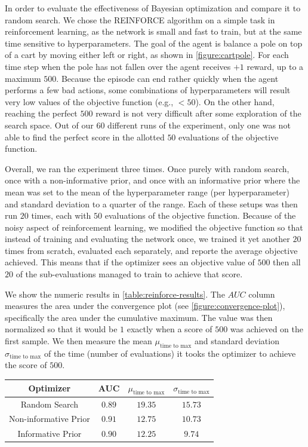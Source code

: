 In order to evaluate the effectiveness of Bayesian optimization and compare it to random search. We chose the REINFORCE algorithm on a simple task in reinforcement learning, as the network is small and fast to train, but at the same time sensitive to hyperparameters. The goal of the agent is balance a pole on top of a cart by moving either left or right, as shown in \autoref{figure:cartpole}. For each time step when the pole has not fallen over the agent receives $+1$ reward, up to a maximum $500$. Because the episode can end rather quickly when the agent performs a few bad actions, some combinations of hyperparameters will result very low values of the objective function (e.g., $< 50$). On the other hand, reaching the perfect $500$ reward is not very difficult after some exploration of the search space. Out of our $60$ different runs of the experiment, only one was not able to find the perfect score in the allotted $50$ evaluations of the objective function.

Overall, we ran the experiment three times. Once purely with random search, once with a non-informative prior, and once with an informative prior where the mean was set to the mean of the hyperparameter range (per hyperparameter) and standard deviation to a quarter of the range. Each of these setups was then run $20$ times, each with $50$ evaluations of the objective function. Because of the noisy aspect of reinforcement learning, we modified the objective function so that instead of training and evaluating the network once, we trained it yet another $20$ times from scratch, evaluated each separately, and reporte the average objective achieved. This means that if the optimizer sees an objective value of $500$ then all $20$ of the sub-evaluations managed to train to achieve that score.

We show the numeric results in \autoref{table:reinforce-results}. The $AUC$ column measures the area under the convergence plot (see \autoref{figure:convergence-plot}), specifically the area under the cumulative maximum. The value was then normalized so that it would be $1$ exactly when a score of $500$ was achieved on the first sample. We then measure the mean $\mu_{\text{time to max}}$ and standard deviation $\sigma_{\text{time to max}}$ of the time (number of evaluations) it tooks the optimizer to achieve the score of $500$.

\begin{center}
	\begin{tabular}{||c c c c||} 
		\hline
		Optimizer & AUC & $\mu_{\text{time to max}}$ & $\sigma_{\text{time to max}}$ \\ [0.5ex] 
		\hline\hline
		Random Search & $0.89$ & $19.35$ & $15.73$ \\ 
		\hline
		Non-informative Prior & $0.91$ & $12.75$ & $10.73$ \\
		\hline
		Informative Prior & $0.90$ & $12.25$ & $9.74$  \\ [1ex] 
		\hline
	\end{tabular}
	\label{table:reinforce-results}
\end{center}

